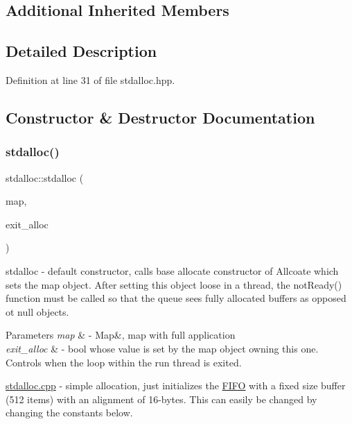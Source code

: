 \subsection*{Additional Inherited Members}


\subsection{Detailed Description}


Definition at line 31 of file stdalloc.\+hpp.



\subsection{Constructor \& Destructor Documentation}
\hypertarget{classstdalloc_afbca819760927fd8ccaac09f22c41834}{}\label{classstdalloc_afbca819760927fd8ccaac09f22c41834} 
\subsubsection{\texorpdfstring{stdalloc()}{stdalloc()}}
{\footnotesize\ttfamily stdalloc\+::stdalloc (\begin{DoxyParamCaption}\item[{\hyperlink{classraft_1_1map}{raft\+::map} \&}]{map,  }\item[{volatile bool \&}]{exit\+\_\+alloc }\end{DoxyParamCaption})}

stdalloc -\/ default constructor, calls base allocate constructor of Allcoate which sets the map object. After setting this object loose in a thread, the not\+Ready() function must be called so that the queue sees fully allocated buffers as opposed ot null objects. 
\begin{DoxyParams}{Parameters}
{\em map} & -\/ Map\&, map with full application \\
\hline
{\em exit\+\_\+alloc} & -\/ bool whose value is set by the map object owning this one. Controls when the loop within the run thread is exited.\\
\hline
\end{DoxyParams}
\hyperlink{stdalloc_8cpp_source}{stdalloc.\+cpp} -\/ simple allocation, just initializes the \hyperlink{class_f_i_f_o}{F\+I\+FO} with a fixed size buffer (512 items) with an alignment of 16-\/bytes. This can easily be changed by changing the constants below.

